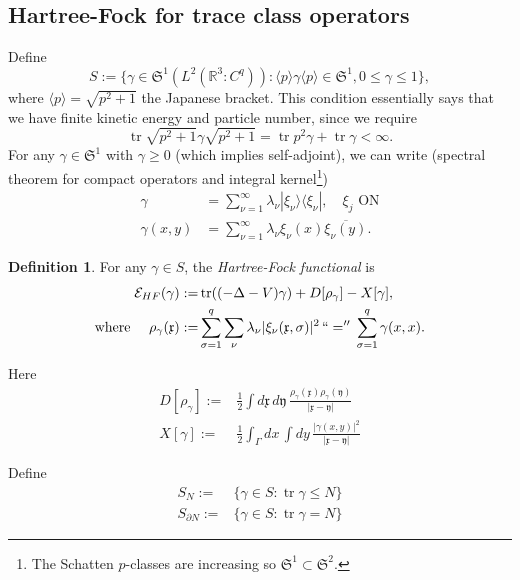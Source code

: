 \documentclass[11pt]{amsart}
\newcommand{\vocab}[1]{\emph{#1}}
\newcommand{\R}{\mathbb{R}}
\theoremstyle{definition}
\theoremstyle{definition}
\newtheorem{defn}{Definition}
\theoremstyle{definition}
\numberwithin{equation}{section}
\begin{document}
\subsection{Hartree-Fock for trace class operators}
Define 
\[
S:=\{\gamma\in\mathfrak{S}^1(L^2(\R^3:C^q)):\langle p\rangle \gamma\langle p\rangle \in\mathfrak{S}^1,0\le\gamma\le1\},
\]
where $\langle p\rangle=\sqrt{p^2+1}$ the Japanese bracket. This condition essentially says that we have finite kinetic energy and particle number, since we require
\[
\operatorname{tr}\sqrt{p^2+1}\gamma\sqrt{p^2+1}=\operatorname{tr}p^2\gamma+\operatorname{tr}\gamma<\infty.
\]
For any $\gamma\in\mathfrak{S}^1$ with $\gamma\ge0$ (which implies self-adjoint), we can write (spectral theorem for compact operators and integral kernel\footnote{The Schatten $p$-classes are increasing so $\mathfrak{S}^1\subset\mathfrak{S}^2$.}) %
\begin{align}
\gamma&=\sum_{\nu=1}^\infty\lambda_\nu|\xi_\nu\rangle\langle\xi_\nu|,\quad \xi_j\text{ ON}\\
\gamma(x,y)&=\sum_{\nu=1}^\infty\lambda_\nu\xi_\nu(x)\overline{\xi_\nu(y)}.
\end{align}
\begin{defn}
For any $\gamma\in S$,%
the \vocab{Hartree-Fock functional} is
\begin{align}
\mathcal{E}_{HF}(\gamma):=&\operatorname{tr}((-\Delta-V)\gamma)+D[\rho_\gamma]-X[\gamma],\\
\text{where }\quad\rho_\gamma(\mathfrak{x}):=&\sum_{\sigma=1}^q\sum_\nu\lambda_\nu|\xi_\nu(\mathfrak{x},\sigma)|^2\,``=''\,\sum_{\sigma=1}^{q}\gamma(x,x).
\end{align}
\end{defn}
Here 
\begin{align*}
D[\rho_\gamma]:=&\frac{1}{2}\int d\mathfrak{x}\, d\mathfrak{y}\,\frac{\rho_\gamma(\mathfrak{x})\rho_\gamma(\mathfrak{y})}{|\mathfrak{x}-\mathfrak{y}|}\\
X[\gamma]:=&\frac{1}{2}\int_\Gamma dx\,\int dy\,\frac{|\gamma(x,y)|^2}{|\mathfrak{x}-\mathfrak{y}|}
\end{align*}

Define
\begin{align*}
S_N:=&\{\gamma\in S:\operatorname{tr}\gamma\le N\}\\
S_{\partial N}:=&\{\gamma\in S:\operatorname{tr}\gamma=N\}
\end{align*}
\end{document}
